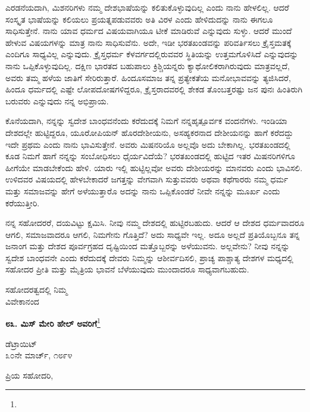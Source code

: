 ಎರಡನೆಯದಾಗಿ, ಮಿಶನರಿಗಳು ನಮ್ಮ ದೇಶಭಾಷೆಯನ್ನು ಕಲಿತುಕೊಳ್ಳುವುದಿಲ್ಲ ಎಂದು ನಾನು ಹೇಳಲಿಲ್ಲ. ಆದರೆ ಸಂಸ್ಕೃತ ಭಾಷೆಯನ್ನು ಕಲಿಯಲು ಪ್ರಯತ್ನಪಡುವವರು ಅತಿ ವಿರಳ ಎಂದು ಹೇಳಿದುದನ್ನು ನಾನು ಈಗಲೂ ಸಾಧಿಸುತ್ತೇನೆ. ನಾನು ಯಾವ ಧರ್ಮದ ವಿಷಯವಾಗಿಯೂ ಟೀಕೆ ಮಾಡಿರುವೆ ಎನ್ನುವುದು ಸುಳ್ಳು. ಆದರೆ ಮುಂದೆ ಹೇಳುವ ವಿಷಯಗಳನ್ನು ಮಾತ್ರ ನಾನು ಸಾಧಿಸುವೆನು. ಅದೇ, ಇಡೀ ಭರತಖಂಡವನ್ನು ಪರಿವರ್ತಿಸಲು ಕ್ರೈಸ್ತಮತಕ್ಕೆ ಎಂದಿಗೂ ಸಾಧ್ಯವಿಲ್ಲ ಎನ್ನುವುದು. ಕ್ರೈಸ್ತಧರ್ಮ ಕೆಳವರ್ಗದಲ್ಲಿರುವವರ ಸ್ಥಿತಿಯನ್ನು ಉತ್ತಮಗೊಳಿಸಿದೆ ಎನ್ನುವುದನ್ನು ನಾನು ಒಪ್ಪಿಕೊಳ್ಳುವುದಿಲ್ಲ. ದಕ್ಷಿಣ ಭಾರತದ ಬಹುಪಾಲು ಕ್ರಿಶ್ಚಿಯನ್ನರು ಕ್ಯಾಥೋಲಿಕರಾಗಿರುವುದು ಮಾತ್ರವಲ್ಲದೆ, ಅವರು ತಮ್ಮ ಹಳೆಯ ಜಾತಿಗೆ ಸೇರಿರುತ್ತಾರೆ. ಹಿಂದೂಸಮಾಜ ತನ್ನ ಪ್ರತ್ಯೇಕತೆಯ ಮನೋಭಾವವನ್ನು ತ್ಯಜಿಸಿದರೆ, ಹಿಂದೂ ಧರ್ಮದಲ್ಲಿ ಎಷ್ಟೇ ಲೋಪದೋಷಗಳಿದ್ದರೂ, ಕ್ರೈಸ್ತರಾದವರಲ್ಲಿ ಶೇಕಡ ತೊಂಬತ್ತರಷ್ಟು ಜನ ಪುನಃ ಹಿಂತಿರುಗಿ ಬರುವರು ಎನ್ನುವುದು ನನ್ನ ಅಭಿಪ್ರಾಯ.

\eject

ಕೊನೆಯದಾಗಿ, ನನ್ನನ್ನು ಸ್ವದೇಶ ಬಾಂಧವನೆಂದು ಕರೆದುದಕ್ಕೆ ನಿಮಗೆ ನನ್ನ\break  ಹೃತ್ಪೂರ್ವಕ ವಂದನೆಗಳು. ಇಂಡಿಯಾ ದೇಶದಲ್ಲೇ ಹುಟ್ಟಿದ್ದರೂ, ಯೂರೋಪಿಯನ್ ಹೊರದೇಶೀಯನು, ಅಸಹ್ಯಕರನಾದ ದೇಶೀಯನನ್ನು ಹಾಗೆ ಕರೆದದ್ದು ಇದೇ ಪ್ರಥಮ ಎಂದು ನಾನು ಭಾವಿಸುತ್ತೇನೆ. ಅವರು ಮಿಷನರಿಯೊ ಅಲ್ಲವೊ ಅದು ಬೇಕಾಗಿಲ್ಲ. ಭರತಖಂಡದಲ್ಲಿ ಕೂಡ ನಿಮಗೆ ಹಾಗೆ ನನ್ನನ್ನು ಸಂಬೋಧಿಸಲು ಧೈರ್ಯವಿದೆಯೆ? ಭರತಖಂಡದಲ್ಲಿ ಹುಟ್ಟಿದ ಇತರ ಮಿಷನರಿಗಳಿಗೂ ಹೀಗೆಯೇ ಮಾಡಬೇಕೆಂದು ಹೇಳಿ. ಯಾರು ಇಲ್ಲಿ ಹುಟ್ಟಿಲ್ಲವೋ ಅವರು ದೇಶೀಯರನ್ನು ಮಾನವರು ಎಂದು ಭಾವಿಸಲಿ. ಉಳಿದವರ ವಿಷಯದಲ್ಲಿ ಹೇಳಬೇಕಾದರೆ \enginline{-} ಜಗತ್ತನ್ನು ವೇಗವಾಗಿ ಸುತ್ತುವವರು ಅಥವಾ ಕಥೆಗಾರರು ನಮ್ಮ ಧರ್ಮ ಮತ್ತು ಸಮಾಜವನ್ನು ಹೇಗೆ ಅಳೆಯುತ್ತಾರೊ ಅದನ್ನು ನಾನು ಒಪ್ಪಿಕೊಂಡರೆ ನೀವೇ ನನ್ನನ್ನು ಮೂರ್ಖ ಎಂದು ಕರೆಯುತ್ತೀರಿ.

ನನ್ನ ಸಹೋದರರೆ, ದಯವಿಟ್ಟು ಕ್ಷಮಿಸಿ. ನೀವು ನಮ್ಮ ದೇಶದಲ್ಲಿ ಹುಟ್ಟಿರಬಹುದು. ಆದರೆ ಆ ದೇಶದ ಧರ್ಮವಾದರೂ ಆಗಲಿ, ಸಮಾಜವಾದರೂ ಆಗಲಿ, ನಿಮಗೇನು ಗೊತ್ತಿದೆ? ಅದು ಸಾಧ್ಯವೇ ಇಲ್ಲ. ಅದೂ ಅಲ್ಲದೆ ಪ್ರತಿಯೊಬ್ಬನೂ ತನ್ನ ಜನಾಂಗ ಮತ್ತು ದೇಶದ ಪೂರ್ವಗ್ರಹದ ದೃಷ್ಟಿಯಿಂದ ಮತ್ತೊಬ್ಬರನ್ನು ಅಳೆಯುವನು. ಅಲ್ಲವೇನು? ನೀವು ನನ್ನನ್ನು ಸ್ವದೇಶ ಬಾಂಧವನೇ ಎಂದು ಕರೆದುದಕ್ಕೆ ದೇವರು ನಿಮ್ಮನ್ನು ಆಶೀರ್ವದಿಸಲಿ, ಪ್ರಾಚ್ಯ ಪಾಶ್ಚಾತ್ಯ ದೇಶಗಳ ಮಧ್ಯದಲ್ಲಿ ಸಹೋದರ ಪ್ರೀತಿ ಮತ್ತು ಮೈತ್ರಿಯ ಭಾವನೆ ಬೆಳೆಯುವುದು ಮುಂದಾದರೂ ಸಾಧ್ಯವಾಗಬಹುದು.

{\flushright
ಸಹೋದರತ್ವದಲ್ಲಿ ನಿಮ್ಮ\\ವಿವೇಕಾನಂದ\par}

\begin{center}
\textbf{೮೩. ಮಿಸ್ ಮೇರಿ ಹೇಲ್‌ ಅವರಿಗೆ}\footnote{}
\end{center}

\begin{flushright}
ಡೆಟ್ರಾಯಿಟ್\\೩೦ನೇ ಮಾರ್ಚ್, ೧೮೯೪
\end{flushright}

\noindent
ಪ್ರಿಯ ಸಹೋದರಿ,

